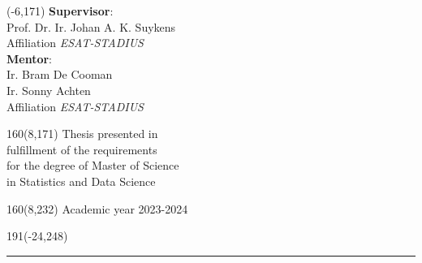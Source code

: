 \begin{textblock}{70}(-6,171)
\textblockcolour{}
\vspace{-\parskip}
\flushleft
\fontsize{16}{18}\selectfont
\textbf{Supervisor}:\\ Prof. Dr. Ir. Johan A. K.
Suykens\\[-2pt]
\textcolor{blueaff}{Affiliation \textsl{ESAT-STADIUS}}\\[5pt]
\textbf{Mentor}:\\ Ir. Bram De Cooman \\ Ir. Sonny Achten\\
\textcolor{blueaff}{Affiliation \textsl{ESAT-STADIUS}}\\
\end{textblock}
%
\begin{textblock}{160}(8,171)
\textblockcolour{}
\vspace{-\parskip}
\flushright
\fontsize{16}{18}\selectfont
Thesis presented in \\
fulfillment of the requirements \\
for the degree of Master of Science \\
in Statistics and Data Science
\end{textblock}
%
\begin{textblock}{160}(8,232)
\textblockcolour{}
\vspace{-\parskip}
\flushright
\fontsize{16}{18}\selectfont
Academic year 2023-2024
\end{textblock}
%
\begin{textblock}{191}(-24,248)
{\color{blueline}\rule{550pt}{5.5pt}}
\end{textblock}
%
\vfill
